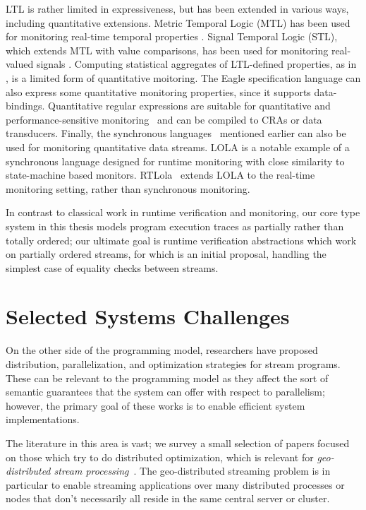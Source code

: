 LTL is rather limited in expressiveness, but has been extended in various ways,
including quantitative extensions.
Metric Temporal Logic (MTL) has been used for monitoring real-time temporal properties \cite{TR2005MTL}. Signal Temporal Logic (STL), which extends MTL with value comparisons, has been used for monitoring real-valued signals \cite{DDGJJS2017}.
Computing statistical aggregates of LTL-defined properties, as in \cite{finkbeiner2002collecting}, is a limited form of quantitative moitoring.
The Eagle specification language \cite{barringer2004rule} can also express some quantitative monitoring properties, since it supports data-bindings.
Quantitative regular expressions are suitable for quantitative and performance-sensitive monitoring~\cite{QRE,StreamQRE,YLMMAL2017NQRE,AAMMR2018}
and can be compiled to CRAs or data transducers.
Finally, the synchronous languages~\cite{BCEHlGdS2003SL} mentioned earlier can also be used for monitoring quantitative data streams.
LOLA \cite{d2005lola,bozzelli2016foundations} is a notable example of a synchronous language designed for runtime monitoring
with close similarity to state-machine based monitors.
RTLola~\cite{faymonville2017real} extends LOLA to the real-time monitoring setting, rather than synchronous monitoring.

In contrast to classical work in runtime verification and monitoring, our core type system in this thesis models program execution traces as partially rather than totally ordered; our ultimate goal is runtime verification abstractions which work on partially ordered streams, for which  is an initial proposal, handling the simplest case of equality checks between streams.

\section{Selected Systems Challenges}

On the other side of the programming model,
researchers have proposed distribution, parallelization, and optimization strategies for stream programs.
These can be relevant to the programming model as they affect the sort of semantic guarantees that the system can offer with respect to parallelism;
however, the primary goal of these works is to enable efficient system implementations.

The literature in this area is vast; we survey a small selection of papers focused on those which try to do distributed optimization, which is relevant for \emph{geo-distributed stream processing}~. The geo-distributed streaming problem is in particular to enable streaming applications over many distributed processes or nodes that don't necessarily all reside in the same central server or cluster.

